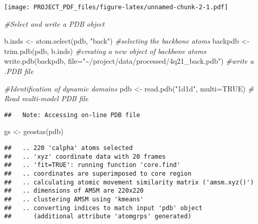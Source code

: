 \documentclass[
]{article}
\newenvironment{Shaded}{\begin{snugshade}}{\end{snugshade}}
\newcommand{\AttributeTok}[1]{\textcolor[rgb]{0.77,0.63,0.00}{#1}}
\newcommand{\CommentTok}[1]{\textcolor[rgb]{0.56,0.35,0.01}{\textit{#1}}}
\newcommand{\ConstantTok}[1]{\textcolor[rgb]{0.00,0.00,0.00}{#1}}
\newcommand{\FunctionTok}[1]{\textcolor[rgb]{0.00,0.00,0.00}{#1}}
\newcommand{\NormalTok}[1]{#1}
\newcommand{\OtherTok}[1]{\textcolor[rgb]{0.56,0.35,0.01}{#1}}
\newcommand{\SpecialCharTok}[1]{\textcolor[rgb]{0.00,0.00,0.00}{#1}}
\newcommand{\StringTok}[1]{\textcolor[rgb]{0.31,0.60,0.02}{#1}}
\begin{document}
\begin{Shaded}
\end{Shaded}

\texttt{[image: PROJECT\_PDF\_files/figure-latex/unnamed-chunk-2-1.pdf]}

\begin{Shaded}
\begin{Highlighting}[]
\CommentTok{\#Select and write a PDB object}

\NormalTok{b.inds }\OtherTok{\textless{}{-}} \FunctionTok{atom.select}\NormalTok{(pdb, }\StringTok{"back"}\NormalTok{) }\CommentTok{\#selecting the backbone atoms}
\NormalTok{backpdb }\OtherTok{\textless{}{-}} \FunctionTok{trim.pdb}\NormalTok{(pdb, b.inds) }\CommentTok{\#creating a new object of backbone atoms}
\FunctionTok{write.pdb}\NormalTok{(backpdb, }\AttributeTok{file=}\StringTok{"\textasciitilde{}/project/data/processed/4q21\_back.pdb"}\NormalTok{) }\CommentTok{\#write a .PDB file}

\CommentTok{\#Identification of dynamic domains }
\NormalTok{pdb }\OtherTok{\textless{}{-}} \FunctionTok{read.pdb}\NormalTok{(}\StringTok{"1d1d"}\NormalTok{, }\AttributeTok{multi=}\ConstantTok{TRUE}\NormalTok{) }\CommentTok{\# Read multi{-}model PDB file}
\end{Highlighting}
\end{Shaded}

\begin{verbatim}
##   Note: Accessing on-line PDB file
\end{verbatim}

\begin{Shaded}
\begin{Highlighting}[]
\NormalTok{gs }\OtherTok{\textless{}{-}} \FunctionTok{geostas}\NormalTok{(pdb)}
\end{Highlighting}
\end{Shaded}

\begin{verbatim}
##   .. 220 'calpha' atoms selected
##   .. 'xyz' coordinate data with 20 frames 
##   .. 'fit=TRUE': running function 'core.find'
##   .. coordinates are superimposed to core region
##   .. calculating atomic movement similarity matrix ('amsm.xyz()') 
##   .. dimensions of AMSM are 220x220
##   .. clustering AMSM using 'kmeans' 
##   .. converting indices to match input 'pdb' object 
##      (additional attribute 'atomgrps' generated)
\end{verbatim}
\end{document}
